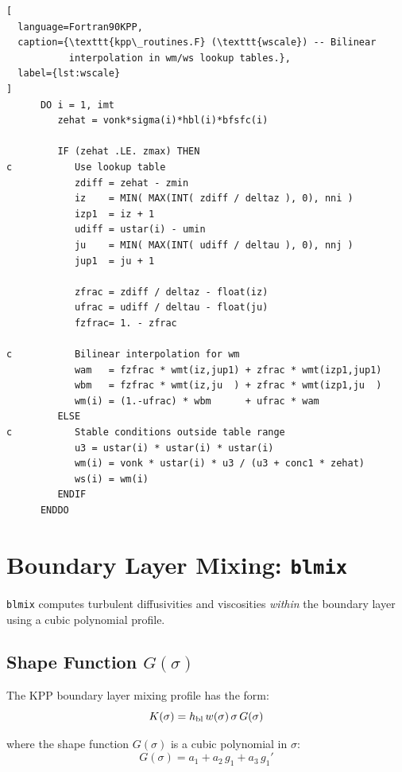\documentclass[12pt,letterpaper]{article}
\begin{document}
\begin{lstlisting}[  
  language=Fortran90KPP,  
  caption={\texttt{kpp\_routines.F} (\texttt{wscale}) -- Bilinear  
           interpolation in wm/ws lookup tables.},  
  label={lst:wscale}  
]  
      DO i = 1, imt  
         zehat = vonk*sigma(i)*hbl(i)*bfsfc(i)  
  
         IF (zehat .LE. zmax) THEN  
c           Use lookup table  
            zdiff = zehat - zmin  
            iz    = MIN( MAX(INT( zdiff / deltaz ), 0), nni )  
            izp1  = iz + 1  
            udiff = ustar(i) - umin  
            ju    = MIN( MAX(INT( udiff / deltau ), 0), nnj )  
            jup1  = ju + 1  
  
            zfrac = zdiff / deltaz - float(iz)  
            ufrac = udiff / deltau - float(ju)  
            fzfrac= 1. - zfrac  
  
c           Bilinear interpolation for wm  
            wam   = fzfrac * wmt(iz,jup1) + zfrac * wmt(izp1,jup1)  
            wbm   = fzfrac * wmt(iz,ju  ) + zfrac * wmt(izp1,ju  )  
            wm(i) = (1.-ufrac) * wbm      + ufrac * wam  
         ELSE  
c           Stable conditions outside table range  
            u3 = ustar(i) * ustar(i) * ustar(i)  
            wm(i) = vonk * ustar(i) * u3 / (u3 + conc1 * zehat)  
            ws(i) = wm(i)  
         ENDIF  
      ENDDO  
\end{lstlisting}  
  
\section{Boundary Layer Mixing: \texttt{blmix}}  
  
\texttt{blmix} computes turbulent diffusivities and viscosities  
\textit{within} the boundary layer using a cubic polynomial profile.  
  
\subsection{Shape Function $G(\sigma)$}  
  
The KPP boundary layer mixing profile has the form:  
\begin{equation}  
K(\sigma) = h_{\rm bl}\,w(\sigma)\,\sigma\,G(\sigma)  
\end{equation}  
  
where the shape function $G(\sigma)$ is a cubic polynomial in $\sigma$:  
\begin{equation}  
G(\sigma) = a_1 + a_2\,g_1 + a_3\,g_1'  
\end{equation}  
  
\end{document}
